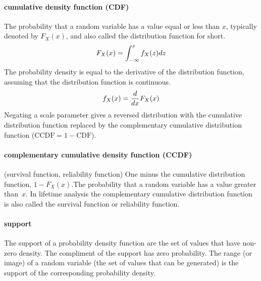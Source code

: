 \paragraph*{cumulative density function (CDF)} 
The probability that a random variable has a value equal or less than $x$, typically denoted by $F_X(x)$, and also called the distribution function for short.
\[
F_X(x) = \int^x_{-\infty} f_X(z) dz 
\notag
\]
The probability density is equal to the derivative of the distribution function, assuming that the distribution function is continuous.
\[
f_X(x) = \frac{d}{dx} F_X(x) 
\notag
\]
Negating a scale parameter gives a reversed distribution with the cumulative distribution function replaced by the complementary cumulative distribution function ($\text{CCDF}=1-\text{CDF}$).



\paragraph*{complementary cumulative density function (CCDF)}  (survival function, reliability function)
One minus the cumulative distribution function,  $1-F_X(x)$.\checked The probability that a random variable has a value greater than~$x$. In lifetime analysis the complementary cumulative distribution function is also called the survival function or reliability function.



\paragraph*{support}
The support of a probability density function are the set of values that have non-zero density. The compliment of the support has zero probability. The range (or image) of a random variable (the set of values that can be generated) is the support of the corresponding probability density.



